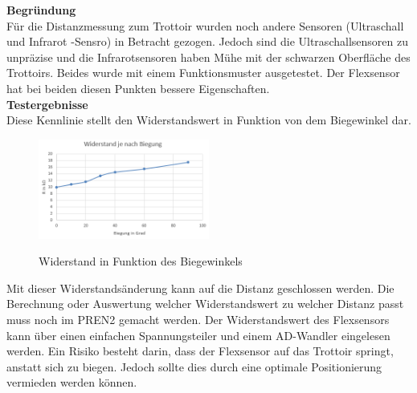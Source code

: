 %
\textbf{Begründung}\\[0.2cm]
Für die Distanzmessung zum Trottoir wurden noch andere Sensoren (Ultraschall und Infrarot -Sensro) in Betracht gezogen. Jedoch sind die Ultraschallsensoren zu unpräzise und die Infrarotsensoren haben Mühe mit der schwarzen Oberfläche des Trottoirs. Beides wurde mit einem Funktionsmuster ausgetestet. Der Flexsensor hat bei beiden diesen Punkten bessere Eigenschaften.\\[0.2cm]
\textbf{Testergebnisse}\\[0.2cm]
Diese Kennlinie stellt den Widerstandswert in Funktion von dem Biegewinkel dar.
\begin{figure}[H]
	\centering
	\includegraphics[width=0.5\textwidth]{03_Loesungskonzept/pictures/Flex_Biegungskennline.png}
	\label{fig:Flex_R_Kennlinie}
	\caption{Widerstand in Funktion des Biegewinkels}
\end{figure}\flushleft
%
Mit dieser Widerstandsänderung kann auf die Distanz geschlossen werden. Die Berechnung oder Auswertung welcher Widerstandswert zu welcher Distanz passt muss noch im PREN2 gemacht werden. Der Widerstandswert des Flexsensors kann über einen einfachen Spannungsteiler und einem AD-Wandler eingelesen werden.
Ein Risiko besteht darin, dass der Flexsensor auf das Trottoir springt, anstatt sich zu biegen. Jedoch sollte dies durch eine optimale Positionierung vermieden werden können.\\[0.2cm]